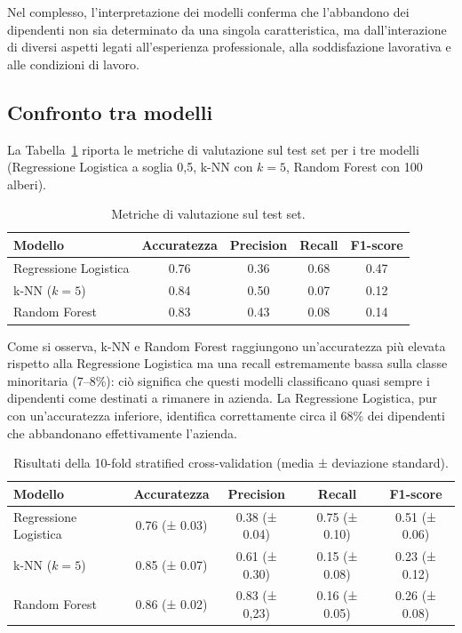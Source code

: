 \documentclass[11pt,a4paper]{article}
\begin{document}
Nel complesso, l'interpretazione dei modelli conferma che l'abbandono dei dipendenti non sia determinato da una singola caratteristica, ma dall'interazione di diversi aspetti legati all'esperienza professionale, alla soddisfazione lavorativa e alle condizioni di lavoro.

\subsection{Confronto tra modelli}

La Tabella~\ref{tab:test} riporta le metriche di valutazione sul test set per i tre modelli (Regressione Logistica a soglia 0,5, k-NN con $k=5$, Random Forest con 100 alberi).

\begin{table}[H]
    \centering
    \caption{Metriche di valutazione sul test set.}
    \label{tab:test}
    \begin{tabular}{lcccc}
        \toprule
        \textbf{Modello} & \textbf{Accuratezza} & \textbf{Precision} & \textbf{Recall} & \textbf{F1-score} \\
        \midrule
        Regressione Logistica & 0.76 & 0.36 & 0.68 & 0.47  \\
        k-NN ($k=5$)          & 0.84 & 0.50 & 0.07 & 0.12  \\
        Random Forest         & 0.83 & 0.43 & 0.08 & 0.14  \\
        \bottomrule
    \end{tabular}
\end{table}

Come si osserva, k-NN e Random Forest raggiungono un'accuratezza pi\`{u} elevata rispetto alla Regressione Logistica ma una recall estremamente bassa sulla classe minoritaria (7--8\%): ci\`{o} significa che questi modelli classificano quasi sempre i dipendenti come destinati a rimanere in azienda. La Regressione Logistica, pur con un'accuratezza inferiore, identifica correttamente circa il 68\% dei dipendenti che abbandonano effettivamente l'azienda.

\begin{table}[H]
    \centering
    \caption{Risultati della 10-fold stratified cross-validation (media ± deviazione standard).}
    \label{tab:cv}
    \begin{tabular}{lcccc}
        \toprule
        \textbf{Modello} & \textbf{Accuratezza} & \textbf{Precision} & \textbf{Recall} & \textbf{F1-score} \\
        \midrule
        Regressione Logistica & 0.76 (± 0.03) & 0.38 (± 0.04) & 0.75 (± 0.10) & 0.51 (± 0.06) \\
        k-NN ($k=5$)          & 0.85 (± 0.07) & 0.61 (± 0.30) & 0.15 (± 0.08) & 0.23 (± 0.12) \\
        Random Forest         & 0.86 (± 0.02) & 0.83 (± 0,23) & 0.16 (± 0.05) & 0.26 (± 0.08) \\
        \bottomrule
    \end{tabular}
\end{table}
\end{document}
